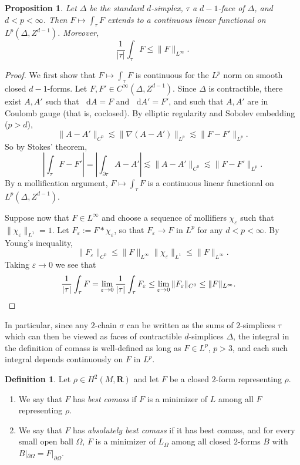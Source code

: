 \documentclass[reqno,11pt]{amsart}
\newcommand{\RR}{\mathbf{R}}
\newcommand*\dif{\mathop{}\!\mathrm{d}}
\newcommand{\dfn}[1]{\emph{#1}\index{#1}}
\newtheorem{proposition}[theorem]{Proposition}
\theoremstyle{definition}
\newtheorem{definition}[theorem]{Definition}
\numberwithin{equation}{section}
\begin{document}
\begin{proposition}
Let $\Delta$ be the standard $d$-simplex, $\tau$ a $d-1$-face of $\Delta$, and $d < p < \infty$.
Then $F \mapsto \int_\tau F$ extends to a continuous linear functional on $L^p(\Delta, Z^{d - 1})$.
Moreover,
\begin{equation}\label{integral over chain is linfinity}
	\frac{1}{|\tau|} \int_\tau F \leq \|F\|_{L^\infty}.
\end{equation}
\end{proposition}
\begin{proof}
We first show that $F \mapsto \int_\tau F$ is continuous for the $L^p$ norm on smooth closed $d-1$-forms.
Let $F, F' \in C^\infty(\Delta, Z^{d - 1})$.
Since $\Delta$ is contractible, there exist $A, A'$ such that $\dif A = F$ and $\dif A' = F'$, and such that $A, A'$ are in Coulomb gauge (that is, coclosed).
By elliptic regularity and Sobolev embedding ($p > d$),
$$\|A - A'\|_{C^0} \lesssim \|\nabla(A - A')\|_{L^p} \lesssim \|F - F'\|_{L^p}.$$
So by Stokes' theorem,
$$\left|\int_\tau F - F'\right| = \left|\int_{\partial \tau} A - A'\right| \lesssim \|A - A'\|_{C^0} \lesssim \|F - F'\|_{L^p}.$$
By a mollification argument, $F \mapsto \int_\tau F$ is a continuous linear functional on $L^p(\Delta, Z^{d - 1})$.

Suppose now that $F \in L^\infty$ and choose a sequence of mollifiers $\chi_\varepsilon$ such that $\|\chi_\varepsilon\|_{L^1} = 1$.
Let $F_\varepsilon := F * \chi_\varepsilon$, so that $F_\varepsilon \to F$ in $L^p$ for any $d < p < \infty$.
By Young's inequality, 
$$\|F_\varepsilon\|_{C^0} \leq \|F\|_{L^\infty} \|\chi_\varepsilon\|_{L^1} \leq \|F\|_{L^\infty}.$$
Taking $\varepsilon \to 0$ we see that
\begin{align*}
\frac{1}{|\tau|} \int_\tau F 
&= \lim_{\varepsilon \to 0} \frac{1}{|\tau|} \int_\tau F_\varepsilon \leq \lim_{\varepsilon \to 0} \|F_\varepsilon\|_{C^0} \leq \|F\|_{L^\infty}. \qedhere
\end{align*}
\end{proof}

In particular, since any $2$-chain $\sigma$ can be written as the sums of $2$-simplices $\tau$ which can then be viewed as faces of contractible $d$-simplices $\Delta$, the integral in the definition of comass is well-defined as long as $F \in L^p$, $p > 3$, and each such integral depends continuously on $F$ in $L^p$.

\begin{definition}
	Let $\rho \in H^2(M, \RR)$ and let $F$ be a closed $2$-form representing $\rho$.
\begin{enumerate}
	\item We say that $F$ has \dfn{best comass} if $F$ is a minimizer of $L$ among all $F$ representing $\rho$.
	\item We say that $F$ has \dfn{absolutely best comass} if it has best comass, and for every small open ball $\Omega$, $F$ is a minimizer of $L_\Omega$ among all closed $2$-forms $B$ with $B|_{\partial \Omega} = F|_{\partial \Omega}$.
\end{enumerate}
\end{definition}
\end{document}
